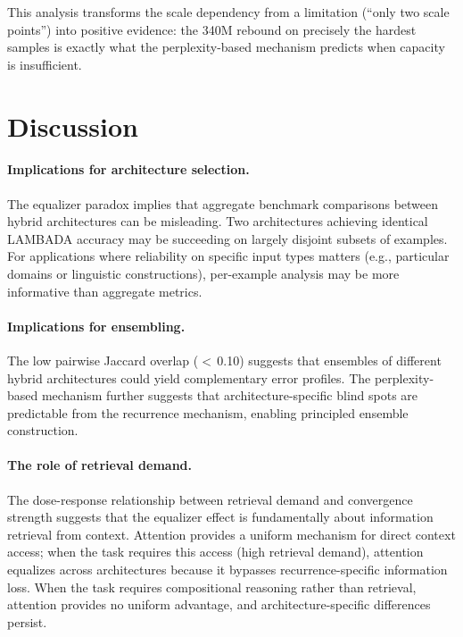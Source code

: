 \documentclass[11pt,a4paper]{article}
\begin{document}
This analysis transforms the scale dependency from a limitation (``only two scale points'') into positive evidence: the 340M rebound on precisely the hardest samples is exactly what the perplexity-based mechanism predicts when capacity is insufficient.


\section{Discussion}

\paragraph{Implications for architecture selection.}
The equalizer paradox implies that aggregate benchmark comparisons between hybrid architectures can be misleading.
Two architectures achieving identical LAMBADA accuracy may be succeeding on largely disjoint subsets of examples.
For applications where reliability on specific input types matters (e.g., particular domains or linguistic constructions), per-example analysis may be more informative than aggregate metrics.

\paragraph{Implications for ensembling.}
The low pairwise Jaccard overlap ($<$\,0.10) suggests that ensembles of different hybrid architectures could yield complementary error profiles.
The perplexity-based mechanism further suggests that architecture-specific blind spots are predictable from the recurrence mechanism, enabling principled ensemble construction.

\paragraph{The role of retrieval demand.}
The dose-response relationship between retrieval demand and convergence strength suggests that the equalizer effect is fundamentally about information retrieval from context.
Attention provides a uniform mechanism for direct context access; when the task requires this access (high retrieval demand), attention equalizes across architectures because it bypasses recurrence-specific information loss.
When the task requires compositional reasoning rather than retrieval, attention provides no uniform advantage, and architecture-specific differences persist.
\end{document}
